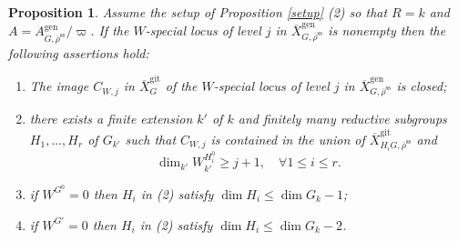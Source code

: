 \documentclass{amsart}
\newtheorem{prop}{Proposition}[section]
\theoremstyle{definition}
\theoremstyle{remark}
\newcommand{\rhobar}{\overline{\rho}}
\newcommand{\gen}{\mathrm{gen}}
\newcommand{\gps}{\mathrm{git}}
\newcommand{\Xbar}{\overline{X}}
\newcommand{\XbargpsG}{\overline{X}^{\gps}_G}
\newcommand{\rhobarss}{\rhobar^{\mathrm{ss}}}
\begin{document}
\begin{prop}\label{WGH} Assume the setup of Proposition  \ref{setup} (2) so that 
$R=k$ and $A=A^{\gen}_{G, \rhobarss}/\varpi$. If the $W$-special locus of 
level $j$ in $\Xbar^{\gen}_{G, \rhobarss}$ is nonempty then 
the following assertions hold: 
\begin{enumerate} 
\item The image $C_{W,j}$ in $\XbargpsG$ of the $W$-special locus of level $j$ in $\Xbar^{\gen}_{G, \rhobarss}$ is closed;
\item there exists a finite extension $k'$ of $k$ and 
finitely many reductive subgroups $H_1, \ldots, H_r$ of $G_{k'}$ such that 
$C_{W,j}$ is contained in the union of $\Xbar^{\gps}_{H_iG, \rhobarss}$ and 
$$ \dim_{k'} W_{k'}^{H_i^0} \ge j+1, \quad \forall 1\le i\le r.$$
\item if $W^{G^0}=0$ then $H_i$ in (2) satisfy
$\dim H_i\le \dim G_k-1$;
\item if $W^{G'}=0$ then $H_i$ in (2) satisfy $\dim H_i\le \dim G_k -2$. 
\end{enumerate}
\end{prop} 
\end{document}
